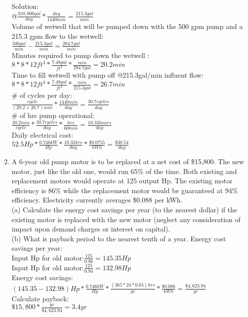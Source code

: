 \begin{enumerate}
\vspace{0.4cm}
Solution:\\
@$\frac{310,000gal}{day}*\frac{day}{1440min}=\frac{215.3gal}{min}$\\
\vspace{0.4cm}
Volume of wetwell that will be pumped down with the 500 gpm pump and a 215.3 gpm flow to the wetwell:\\
$\frac{500gal}{min}-\frac{215.3gal}{min}=\frac{284.7gal}{min}$\\
\vspace{0.4cm}
Minutes required to pump down the wetwell :\\
$8*8*12ft^3*\frac{7.48gal}{ft^3}*\frac{min}{284.7gal}=\boxed{20.2min}$\\
\vspace{0.4cm}
Time to fill wetwell with pump off @215.3gal/min influent flow:
\\
$8*8*12ft^3*\frac{7.48gal}{ft^3}*\frac{min}{215.3gal}=26.7min$\\
\vspace{0.4cm}
\# of cycles per day:\\
$\frac{cycle}{(20.2+26.7)min}*\frac{1440min}{day}=\frac{30.7cycles}{day}$\\
\vspace{0.4cm}
\# of hrs pump operational:\\
$\frac{20.2min}{cycle}*\frac{30.7 cycles}{day}*\frac{hrs}{60min}=\frac{10.33hours}{day}$\\
\vspace{0.4cm}
Daily electrical cost:\\
$52.5Hp*\frac{0.746kW}{Hp}*\frac{10.33hrs}{day}*\frac{\$0.0755}{kWh}=\boxed{\frac{\$30.54}{day}}$\\
\pagebreak


\item A 6-year old pump motor is to be replaced at a net cost of \$15,800. The new motor, just like the old one, would run 65\% of the time. Both existing and replacement motors would operate at 125 output Hp. The existing motor efficiency is 86\% while the replacement motor would be guaranteed at 94\% efficiency. Electricity currently averages \$0.088 per kWh.\\
(a) Calculate the energy cost savings per year (to the nearest dollar) if the existing motor is replaced with the new motor (neglect any consideration of impact upon demand charges or interest on capital).\\ (b) What is payback period to the nearest tenth of a year.
\vspace{0.4cm}
Energy cost savings per year:\\
Input Hp for old motor:$\frac{125}{0.86}=145.35Hp$\\
Input Hp for old motor:$\frac{125}{0.94}=132.98Hp$\\
Energy cost savings:\\$(145.35-132.98)Hp*\frac{0.746kW}{Hp}*\frac{(365*24*0.65)hrs}{yr}*\frac{\$0.088}{kWh}=\boxed{\frac{\$4,623.94}{yr}}$\\
\vspace{0.4cm}
Calculate payback:\\
$\$15,800*\frac{yr}{\$4,623.94}=\boxed{3.4yr}$


\end{enumerate}
